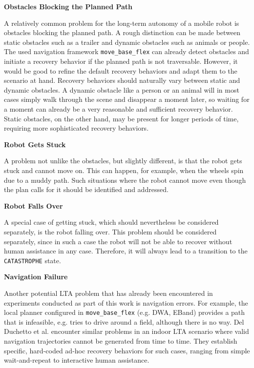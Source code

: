 \documentclass[english, master, utf8]{base/thesis_KBS}
\newcommand{\code}[1]{\colorbox{light-gray}{\texttt{#1}}}
\begin{document}
\noindent
\textbf{Obstacles Blocking the Planned Path}\newline

\noindent
A relatively common problem for the long-term autonomy of a mobile robot is obstacles blocking the planned path.
A rough distinction can be made between static obstacles such as a trailer and dynamic obstacles such as animals or people.
The used navigation framework \code{move\_base\_flex} can already detect obstacles and initiate a recovery behavior if the planned path is not traversable.
However, it would be good to refine the default recovery behaviors and adapt them to the scenario at hand. Recovery behaviors should naturally vary between
static and dynamic obstacles. A dynamic obstacle like a person or an animal will in most cases simply walk through the scene and disappear a moment later,
so waiting for a moment can already be a very reasonable and sufficient recovery behavior. Static obstacles, on the other hand, may be present for longer 
periods of time, requiring more sophisticated recovery behaviors.\newline

\noindent
\textbf{Robot Gets Stuck}\newline

\noindent
A problem not unlike the obstacles, but slightly different, is that the robot gets stuck and cannot move on. This can happen, for example, when the wheels spin due 
to a muddy path. Such situations where the robot cannot move even though the plan calls for it should be identified and addressed.\newline

\noindent
\textbf{Robot Falls Over}\newline

\noindent
A special case of getting stuck, which should nevertheless be considered separately, is the robot falling over.
This problem should be considered separately, since in such a case the robot will not be able to recover without human assistance in any case.
Therefore, it will always lead to a transition to the \code{CATASTROPHE} state.\newline

\noindent
\textbf{Navigation Failure}\newline

\noindent
Another potential LTA problem that has already been encountered in experiments conducted as part of this work is navigation errors.
For example, the local planner configured in \code{move\_base\_flex} (e.g. DWA, EBand) provides a path that is infeasible, e.g. tries to drive around a field, 
although there is no way. Del Duchetto et al. encounter similar problems in an indoor LTA scenario where valid navigation trajectories cannot be generated from time to time.
They establish specific, hard-coded ad-hoc recovery behaviors for such cases, ranging from simple wait-and-repeat to interactive human assistance. \cite{DelDuchetto:2018}\newline
\end{document}
